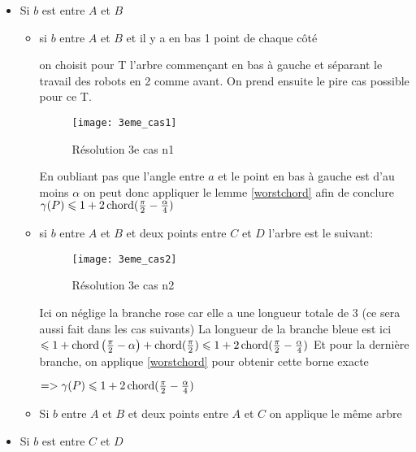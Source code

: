 \begin{itemize}

\item \label{3cas1} Si $b$ est entre $A$ et $B$

\begin{itemize}

\item \label{3cas11} si $b$ entre $A$ et $B$ et il y a en bas 1 point de chaque côté

on choisit pour T l'arbre commençant en bas à gauche et séparant le travail des robots en 2 comme avant.
On prend ensuite le pire cas possible pour ce T.

\begin{figure}[h!]
  \centering
  \texttt{[image: 3eme\_cas1]}
  \caption{Résolution 3e cas n1}
  \label{fig:3eme_cas1}
\end{figure}

En oubliant pas que l'angle entre $a$ et le point en bas à gauche est d'au moins $\alpha$ on peut donc appliquer le lemme \ref{worstchord} afin de conclure
$\gamma(P) \leqslant 1 + 2\operatorname{chord}(\frac{\pi}{2} - \frac{\alpha}{4})$

\item \label{3cas12} si $b$ entre $A$ et $B$ et deux points entre $C$ et $D$
l'arbre est le suivant:

\begin{figure}[h!]
  \centering
  \texttt{[image: 3eme\_cas2]}
  \caption{Résolution 3e cas n2}
  \label{fig:3eme_cas2}
\end{figure}

Ici on néglige la branche rose car elle a une longueur totale de 3 (ce sera aussi fait dans les cas suivants)
La longueur de la branche bleue est ici $\leqslant 1+\operatorname{chord}\left(\frac{\pi}{2} - \alpha\right)+\operatorname{chord}(\frac{\pi}{2}) \leqslant 1 + 2\operatorname{chord}(\frac{\pi}{2} - \frac{\alpha}{4})$
Et pour la dernière branche, on applique \ref{worstchord} pour obtenir cette borne exacte

$=> \gamma(P) \leqslant 1 + 2\operatorname{chord}(\frac{\pi}{2} - \frac{\alpha}{4})$

\item \label{3cas13} Si $b$ entre $A$ et $B$ et deux points entre $A$ et $C$ on applique le même arbre

\end{itemize}

\item \label{3cas2} Si $b$ est entre $C$ et $D$

\begin{itemize}


\end{itemize}
\end{itemize}
